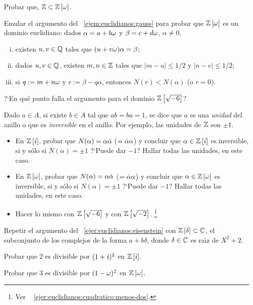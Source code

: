 \begin{ejerEuclidianos}
\begin{enumerate}[(i)]
			Probar que, $\mathbb{Z}\subset{\ensuremath{\mathbb{Z}}}\left[\omega\right]$.
	\end{enumerate}
	Emular el argumento del \ejemname~\ref{ejem:euclidianos:gauss} para
	probar que ${\mathbb{Z}}\left[\omega\right]$ es un dominio euclidiano: dados
	$\alpha=a+b\omega$ y $\beta=c+d\omega$, $\alpha\neq 0$,
	\begin{enumerate}[(i)]
		\item\label{item:ejer:euclidianos:eisenstein:i}
			existen $u,v\in\mathbb{Q}$ tales que
			$(u+v\omega)\alpha=\beta$;
		\item\label{item:ejer:euclidianos:eisenstein:ii}
			dados $u,v\in\mathbb{Q}$, existen $m,n\in\mathbb{Z}$
			tales que $|m-u|\leq 1/2$ y $|n-v|\leq 1/2$;
		\item\label{item:ejer:euclidianos:eisenstein:iii}
			si $q:=m+n\omega$ y $r:=\beta-q\alpha$, entonces
			$N(r)<N(\alpha)$ (o $r=0$).
	\end{enumerate}
	?`En qu\'e punto falla el argumento para el dominio
	${\mathbb{Z}}\left[\sqrt{-6}\right]$?
\end{ejerEuclidianos}

\begin{ejerEuclidianos}\label{ejer:euclidianos:unidades}
	Dado $a\in A$, si existe $b\in A$ tal que $ab=ba=1$, se dice que
	$a$ es una \emph{unidad} del anillo o que es \emph{inversible} en el
	anillo. Por ejemplo, las unidades de $\mathbb{Z}$ son $\pm 1$.
	\begin{itemize}
		\item En ${\mathbb{Z}}\left[\mathit i\right]$, probar que
			$N(\alpha)=\alpha\bar{\alpha}$ ($=\bar{\alpha}\alpha$) y
			concluir que $\alpha\in{\ensuremath{\mathbb{Z}}}\left[\mathit i\right]$ es inversible,
			si y s\'olo si $N(\alpha)=\pm 1$ ?`Puede dar $-1$?
			Hallar todas las unidades, en este caso.
		\item En ${\mathbb{Z}}\left[\omega\right]$, probar que
			$N(\alpha)=\alpha\bar{\alpha}$ ($=\bar{\alpha}\alpha$) y
			concluir que $\alpha\in{\ensuremath{\mathbb{Z}}}\left[\omega\right]$ es
			inversible, si y s\'olo si $N(\alpha)=\pm 1$ ?`Puede
			dar $-1$? Hallar todas las unidades, en este caso.
		\item Hacer lo mismo con ${\mathbb{Z}}\left[\sqrt{-6}\right]$
			y con ${\mathbb{Z}}\left[\sqrt{-2}\right]$.%
			\footnote{
				Ver \ejername~%
				\ref{ejer:euclidianos:cuadratico:menos-dos}.
			}
	\end{itemize}
\end{ejerEuclidianos}

\begin{ejerEuclidianos}\label{ejer:euclidianos:cuadratico:menos-dos}
	Repetir el argumento del \ejername~\ref{ejer:euclidianos:eisenstein}
	con ${\mathbb{Z}}\left[\delta\right]\subset\mathbb{C}$, el subconjunto
	de los complejos de la forma $a+b\delta$, donde $\delta\in\mathbb{C}$
	es ra\'{\i}z de $X^2+2$.
\end{ejerEuclidianos}

\begin{ejerEuclidianos}
	Probar que $2$ es divisible por $(1+\mathit i)^2$ en ${\mathbb{Z}}\left[\mathit i\right]$.
\end{ejerEuclidianos}

\begin{ejerEuclidianos}
	Probar que $3$ es divisible por $(1-\omega)^2$ en
	${\mathbb{Z}}\left[\omega\right]$.
\end{ejerEuclidianos}

